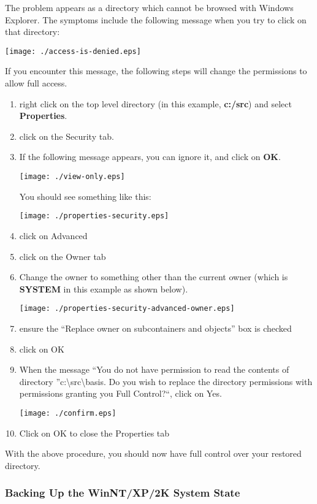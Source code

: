 The problem appears as a directory which cannot be browsed with Windows
Explorer. The symptoms include the following message when you try to click on
that directory: 

\texttt{[image: ./access-is-denied.eps]} 

If you encounter this message, the following steps will change the permissions
to allow full access. 

\begin{enumerate}
\item right click on the top level directory (in this example, {\bf c:/src})
   and  select {\bf Properties}. 
\item click on the Security tab. 
\item If the following message appears, you can ignore it, and click on {\bf
   OK}. 

\texttt{[image: ./view-only.eps]} 

You should see something like this: 

\texttt{[image: ./properties-security.eps]} 
\item click on Advanced 
\item click on the Owner tab 
\item Change the owner to something other than the current owner (which is
   {\bf SYSTEM} in this example as shown below). 

\texttt{[image: ./properties-security-advanced-owner.eps]} 
\item ensure the ``Replace owner on subcontainers and objects'' box is 
   checked 
\item click on OK 
\item When the message ``You do not have permission to read the contents of
   directory ''c:\textbackslash{}src\textbackslash{}basis. Do you wish to replace
   the directory permissions with permissions granting you Full Control?``, click
on Yes. 

\texttt{[image: ./confirm.eps]} 
\item Click on OK to close the Properties tab 
   \end{enumerate}

With the above procedure, you should now have full control over your restored
directory. 

\subsubsection*{Backing Up the WinNT/XP/2K System State}

